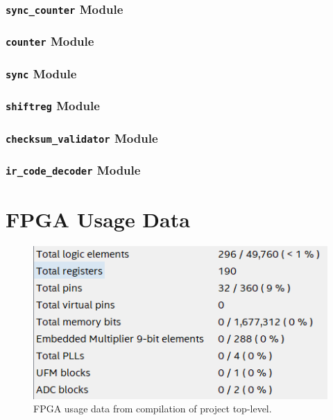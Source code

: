 \documentclass[a4paper]{article}
\makeatletter
\newcommand{\filecaption}[1]{\filename@parse{#1}\filename@base.\filename@ext}
\newcommand{\filelisting}[2][]{%
}
\makeatother
\begin{document}
\subsubsection{\texttt{sync\_counter} Module}
\filelisting[label=lst:sim_vcr_sync_counter]{../do_files/vcr_remote/sync_counter.do}

\subsubsection{\texttt{counter} Module}
\filelisting[label=lst:sim_vcr_counter]{../do_files/vcr_remote/counter.do}

\subsubsection{\texttt{sync} Module}
\filelisting[label=lst:sim_vcr_sync]{../do_files/vcr_remote/sync.do}

\subsubsection{\texttt{shiftreg} Module}
\filelisting[label=lst:sim_vcr_shiftreg]{../do_files/vcr_remote/shiftreg.do}

\subsubsection{\texttt{checksum\_validator} Module}
\filelisting[label=lst:sim_vcr_checksum_validator]{../do_files/vcr_remote/checksum_validator.do}

\subsubsection{\texttt{ir\_code\_decoder} Module}
\filelisting[label=lst:sim_vcr_ir_code_decoder]{../do_files/vcr_remote/ir_code_decoder.do}

\section{FPGA Usage Data}

\begin{figure}[ht]
	\centering
	\includegraphics[width=.6\textwidth]{images/fpga_usage.png}
	\caption{FPGA usage data from compilation of project top-level.}
	\label{fig:fpga_usage}
\end{figure}

\printbibliography
\end{document}
